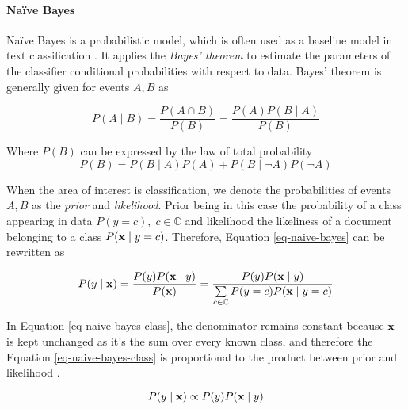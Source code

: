 
\paragraph{Naïve Bayes}


Naïve Bayes is a probabilistic model, which is often used as a baseline model in text classification \cite{acemNBtc2001}. It applies the \emph{Bayes' theorem} to estimate the parameters of the classifier \ie conditional probabilities with respect to data. Bayes' theorem is generally given for events $A, B$ as 

\begin{equation} \label{eq-naive-bayes}
    P(A \mid B) = \dfrac{P(A \cap B)}{P(B)} = \dfrac{P(A)P(B \mid A)}{P(B)}
\end{equation}

\noindent
Where $P(B)$ can be expressed by the law of total probability
\begin{equation}
    P(B) = P(B \mid A)P(A) + P(B \mid \lnot A)P(\lnot A)
\end{equation}

When the area of interest is classification, we denote the probabilities of events $A,B$ as the \emph{prior} and \emph{likelihood}. Prior being in this case the probability of a class appearing in data $P(y=c), \; c \in \mathbb{C}$ and likelihood the likeliness of a document belonging to a class $P(\mathbf{x} \mid y=c)$. Therefore, Equation \ref{eq-naive-bayes} can be rewritten as \cite{Zhang04theoptimality, acemNBtc2001}

\begin{equation} \label{eq-naive-bayes-class}
    P(y \mid \mathbf{x}) = \dfrac{P(y)P(\mathbf{x} \mid y)}{P(\mathbf{x})} = \dfrac{P(y)P(\mathbf{x} \mid y)}{\sum \limits_{c \in \mathbb{C}} P(y=c)P(\mathbf{x} \mid y=c)}
\end{equation}

In Equation \ref{eq-naive-bayes-class}, the denominator remains constant because $\mathbf{x}$ is kept unchanged as it's the sum over every known class, and therefore the Equation \ref{eq-naive-bayes-class} is proportional to the product between prior and likelihood \cite{Manning:2008:IIR:1394399}.

\begin{equation}
    P(y \mid \mathbf{x}) \propto P(y)P(\mathbf{x} \mid y)
\end{equation}

